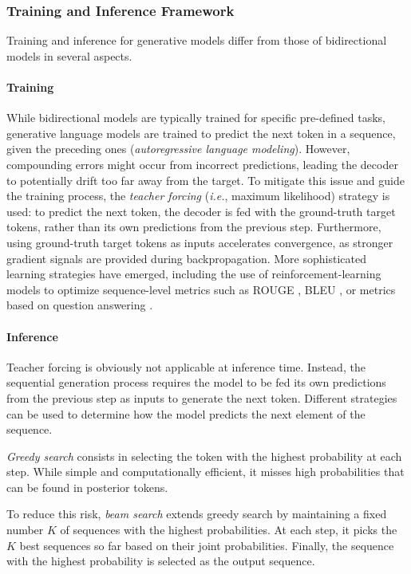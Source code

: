 \subsubsection{Training and Inference Framework}

Training and inference for generative models differ from those of bidirectional models in several aspects.

\paragraph{Training} 

While bidirectional models are typically trained for specific pre-defined tasks, generative language models are trained to predict the next token in a sequence, given the preceding ones (\textit{autoregressive language modeling}). However, compounding errors might occur from incorrect predictions, leading the decoder to potentially drift too far away from the target. To mitigate this issue and guide the training process, the \textit{teacher forcing} (\textit{i.e.}, maximum likelihood) strategy is used: to predict the next token, the decoder is fed with the ground-truth target tokens, rather than its own predictions from the previous step. Furthermore, using ground-truth target tokens as inputs accelerates convergence, as stronger gradient signals are provided during backpropagation. More sophisticated learning strategies have emerged, including the use of reinforcement-learning models to optimize sequence-level metrics such as ROUGE \citep{paulus2017deep}, BLEU \citep{ranzato2015sequence}, or metrics based on question answering \citep{scialom2019answers}.

\paragraph{Inference} 

Teacher forcing is obviously not applicable at inference time. Instead, the sequential generation process requires the model to be fed its own predictions from the previous step as inputs to generate the next token. Different strategies can be used to determine how the model predicts the next element of the sequence. 

\textit{Greedy search} consists in selecting the token with the highest probability at each step. While simple and computationally efficient, it misses high probabilities that can be found in posterior tokens. 

To reduce this risk, \textit{beam search} extends greedy search by maintaining a fixed number $K$  of sequences with the highest probabilities. At each step, it picks the $K$ best sequences so far based on their joint probabilities. Finally, the sequence with the highest probability is selected as the output sequence.

